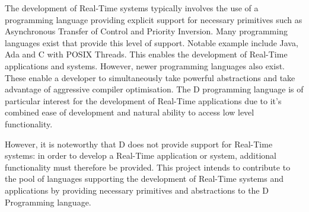 The development of Real-Time systems typically involves the use of a programming 
language providing explicit support for necessary primitives such as Asynchronous 
Transfer of Control and Priority Inversion. 
Many programming languages exist that provide this level of support.
Notable example include Java, Ada and C with POSIX Threads. This enables the 
development of Real-Time applications and systems.
However, newer programming languages also exist. These enable a developer to 
simultaneously take powerful abstractions and take advantage of aggressive 
compiler optimisation. The D programming language is of particular interest for 
the development of Real-Time applications due to it's combined ease of development
and natural ability to access low level functionality.
\par\bigskip\noindent
However, it is noteworthy that D does not provide support for Real-Time systems: 
in order to develop a Real-Time application or system, additional functionality 
must therefore be provided.
This project intends to contribute to the pool of languages supporting the development 
of Real-Time systems and applications by providing necessary primitives and 
abstractions to the D Programming language. 
